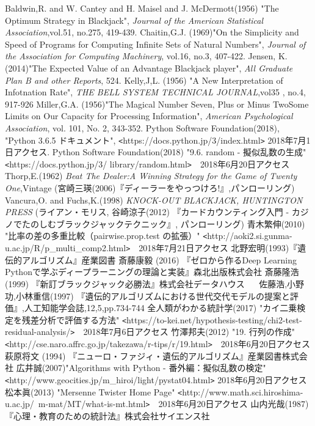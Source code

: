 \begin{thebibliography}{20}
   Baldwin,R. and W. Cantey and H. Maisel and J. McDermott(1956) "The Optimum Strategy in Blackjack", {\it{Journal of the American Statistical Association}},vol.51, no.275, 419-439.
   Chaitin,G.J. (1969)"On the Simplicity and Speed of Programs for Computing Infinite Sets of Natural Numbers", {\it{Journal of the Association for Computing Machinery}}, vol.16, no.3, 407-422.
   Jensen, K. (2014)"The Expected Value of an Advantage Blackjack player", {\it{All Graduate Plan B and other Reports}}, 524.
   Kelly,J,L. (1956) "A New Interpretation of Infotnation Rate", {\it{THE BELL SYSTEM TECHNICAL JOURNAL}},vol35 , no.4, 917-926
   Miller,G.A. (1956)"The Magical Number Seven, Plus or Minus TwoSome Limits on Our Capacity for Processing Information", {\it{American Psychological Association}}, vol. 101, No. 2, 343-352.
   Python Software Foundation(2018), "Python 3.6.5 ドキュメント", \verb|<|https://docs.python.jp/3/index.html\verb|>| 2018年7月1日アクセス.
   Python Software Foundation(2018) "9.6. random - 擬似乱数の生成" \verb|<|https://docs.python.jp/3/ library/random.html\verb|>|　2018年6月20日アクセス
   Thorp,E.(1962) {\it{Beat The Dealer:A Winning Strategy for the Game of Twenty One}},Vintage (宮崎三瑛(2006)『ディーラーをやっつけろ!』,パンローリング)
   Vancura,O. and Fuchs,K.(1998) {\it{KNOCK-OUT BLACKJACK, HUNTINGTON PRESS}} (ライアン・モリス, 谷崎涼子(2012) 『カードカウンティング入門 - カジノでたのしむブラックジャックテクニック』, パンローリング)
   青木繁伸(2010) "比率の差の多重比較（pairwise.prop.test の拡張）" \verb|<|http://aoki2.si.gunma-u.ac.jp/R/p\_multi\_comp2.html\verb|>|　2018年7月21日アクセス
   北野宏明(1993)『遺伝的アルゴリズム』産業図書
   斎藤康毅 (2016) 『ゼロから作るDeep Learning Pythonで学ぶディープラーニングの理論と実装』森北出版株式会社
   斎藤隆浩 (1999) 『新訂ブラックジャック必勝法』株式会社データハウス
　 佐藤浩,小野功,小林重信(1997) 『遺伝的アルゴリズムにおける世代交代モデルの提案と評価』,人工知能学会誌,12,5,pp.734-744
   全人類がわかる統計学(2017) "カイ二乗検定を残差分析で評価する方法" \verb|<|https://to-kei.net/hypothesis-testing/chi2-test-residual-analysis/\verb|>|　2018年7月6日アクセス
   竹澤邦夫(2012) "19. 行列の作成" \verb|<|http://cse.naro.affrc.go.jp/takezawa/r-tips/r/19.html\verb|>|　2018年6月20日アクセス
   萩原将文 (1994) 『ニューロ・ファジィ・遺伝的アルゴリズム』産業図書株式会社
  広井誠(2007)"Algorithms with Python - 番外編：擬似乱数の検定" \verb|<|http://www.geocities.jp/m\_hiroi/light/pystat04.html\verb|>| 2018年6月20日アクセス
   松本眞(2013) "Mersenne Twister Home Page" \verb|<|http://www.math.sci.hiroshima-u.ac.jp/~m-mat/MT/what-is-mt.html\verb|>|　2018年6月20日アクセス
   山内光哉(1987) 『心理・教育のための統計法』株式会社サイエンス社
\end{thebibliography}
